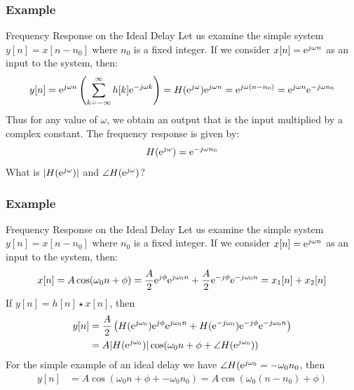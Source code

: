 \documentclass[mathserif,9pt,handout]{beamer}
\begin{document}
\begin{frame}\frametitle{Example}\small
  \begin{block}{Frequency Response on the Ideal Delay}
  Let us examine the simple system $y[n] = x[n-n_0]$ where $n_0$ is a fixed integer. If we consider $x[n] = {\textrm{e}}^{j\omega n}$ as an input to the system, then: 
  \begin{align}
  y[n] = {\textrm{e}}^{j\omega n} \left(\sum_{k=-\infty}^{\infty}h[k] {\textrm{e}}^{-j\omega k}\right) = H({\textrm{e}}^{j\omega}){\textrm{e}}^{j\omega n} = {\textrm{e}}^{j\omega (n - n_0)} = {\textrm{e}}^{j\omega n} {\textrm{e}}^{-j\omega n_0}
  \nonumber
  \end{align}
  Thus for any value of $\omega$, we obtain an output that is the input multiplied by a complex constant. The frequency response is given by: 
  \begin{align}
  H({\textrm{e}}^{j\omega}) = {\textrm{e}}^{-j\omega n_0}
  \nonumber
  \end{align}
  What is $|H({\textrm{e}}^{j\omega})|$ and $\angle H({\textrm{e}}^{j\omega})$?
  \end{block}
\end{frame}


\begin{frame}\frametitle{Example}\small
  \begin{exampleblock}{Frequency Response on the Ideal Delay}
  Let us examine the simple system $y[n] = x[n-n_0]$ where $n_0$ is a fixed integer. If we consider $x[n] = {\textrm{e}}^{j\omega n}$ as an input to the system, then: 
  \begin{align}
    x[n] = A \cos(\omega_0 n + \phi) = \frac{A}{2}{\textrm{e}}^{j\phi}{\textrm{e}}^{j\omega_0 n} + \frac{A}{2}{\textrm{e}}^{-j\phi}{\textrm{e}}^{-j\omega_0 n} = x_1[n] + x_2[n]
    \nonumber
  \end{align}
  If $y[n] = h[n]\star x[n]$, then 
  \begin{align}
    y[n] &= \frac{A}{2}\left( H({\textrm{e}}^{j\omega_0}) {\textrm{e}}^{j\phi}{\textrm{e}}^{j\omega_0 n} +H({\textrm{e}}^{-j\omega_0}) {\textrm{e}}^{-j\phi}{\textrm{e}}^{-j\omega_0 n} \right)
    \nonumber \\
    &= A |H({\textrm{e}}^{j\omega_0})| \cos(\omega_0 n + \phi + \angle H({\textrm{e}}^{j\omega_0}))
    \nonumber
  \end{align}
  For the simple example of an ideal delay we have $\angle H({\textrm{e}}^{j\omega_0} = -\omega_0 n_0$, then 
  \begin{align}
    y[n] &= A  \cos(\omega_0 n + \phi + -\omega_0 n_0)= A  \cos(\omega_0 (n - n_0)+ \phi)
    \nonumber
  \end{align}
  \end{exampleblock}
\end{frame}
\end{document}
